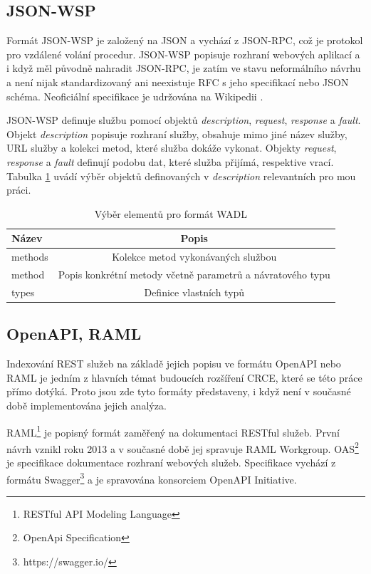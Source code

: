 \documentclass[czech,DP]{thesiskiv}
\begin{document}
\subsection{JSON-WSP}

Formát JSON-WSP je založený na JSON a vychází z JSON-RPC, což je protokol pro vzdálené volání procedur. JSON-WSP popisuje rozhraní webových aplikací a i když měl původně nahradit JSON-RPC, je zatím ve stavu neformálního návrhu a není nijak standardizovaný ani neexistuje RFC s jeho specifikací nebo JSON schéma. Neoficiální specifikace je udržována na Wikipedii \cite{jsonWspSpec}.


JSON-WSP definuje službu pomocí objektů \textit{description}, \textit{request}, \textit{response} a \textit{fault}. Objekt \textit{description} popisuje rozhraní služby, obsahuje mimo jiné název služby, URL služby a kolekci metod, které služba dokáže vykonat. Objekty \textit{request}, \textit{response} a \textit{fault} definují podobu dat, které služba přijímá, respektive vrací. Tabulka \ref{tab:jsonwsp-elements} uvádí výběr objektů definovaných v \textit{description} relevantních pro mou práci.

\begin{table}[h]
	\centering
	\begin{tabular}{|l|c|}
		\hline
		Název & Popis \\
		\hline
		\hline
		methods & Kolekce metod vykonávaných službou \\
		\hline
		method & Popis konkrétní metody včetně parametrů a návratového typu \\
		\hline
		types & Definice vlastních typů \\
		\hline
	\end{tabular}
	\caption{Výběr elementů pro formát WADL}
	\label{tab:jsonwsp-elements} 
\end{table}
 
\subsection{OpenAPI, RAML} 

Indexování REST služeb na základě jejich popisu ve formátu OpenAPI nebo RAML je jedním z hlavních témat budoucích rozšíření CRCE, které se této práce přímo dotýká. Proto jsou zde tyto formáty představeny, i když není v současné době implementována jejich analýza.

RAML\footnote{RESTful API Modeling Language} je popisný formát zaměřený na dokumentaci RESTful služeb. První návrh vznikl roku  2013 a v současné době jej spravuje RAML Workgroup. OAS\footnote{OpenApi Specification} je specifikace dokumentace rozhraní webových služeb. Specifikace vychází z formátu Swagger\footnote{https://swagger.io/} a je spravována konsorciem OpenAPI Initiative.
\end{document}
